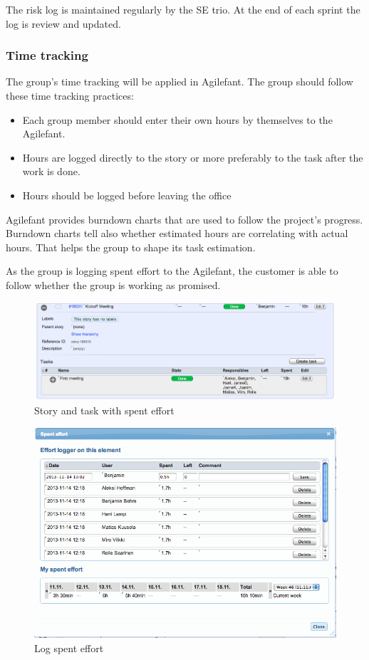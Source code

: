 The risk log is maintained regularly by the SE trio. At the end of each sprint
the log is review and updated.

\subsubsection{Time tracking}

The group's time tracking will be applied in Agilefant. The group should follow 
these time tracking practices:
\begin{itemize}
\item Each group member should enter their own hours by themselves to the 
Agilefant.
\item Hours are logged directly to the story or more preferably to the task 
after the work is done. 
\item Hours should be logged before leaving the office
\end{itemize}

Agilefant provides burndown charts that are used to follow the project's
progress. Burndown charts tell also whether estimated hours are correlating with
actual hours. That helps the group to shape its task estimation.

As the group is logging spent effort to the Agilefant, the customer is able to
follow whether the group is working as promised.

\begin{figure}[H]
\centering
\includegraphics[width=1\textwidth]{imgs/spenteffort1.png}
\caption{Story and task with spent effort}
\label{fig:spenteffort1}
\end{figure}


\begin{figure}[H]
\centering
\includegraphics[width=1\textwidth]{imgs/spenteffort2.png}
\caption{Log spent effort}
\label{fig:spenteffort2}
\end{figure}

